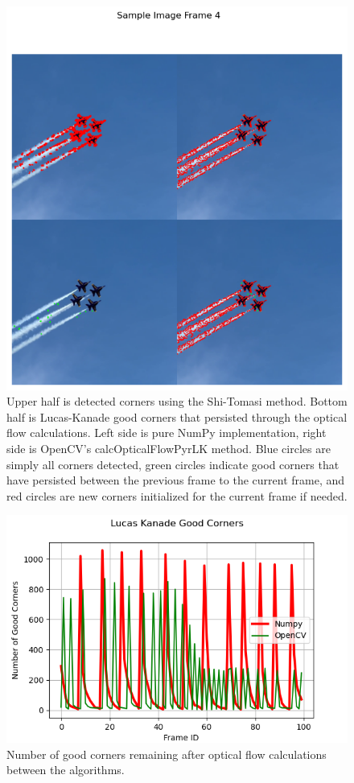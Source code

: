 \documentclass[11pt, conference, letterpaper]{IEEEtran}
\begin{document}
\onecolumn
\begin{figure}[h]
    \centering
    \includegraphics[width=0.8\linewidth]{images/sample_image_4.png}
    \caption{Upper half is detected corners using the Shi-Tomasi method. Bottom half is Lucas-Kanade good corners that persisted through the optical flow calculations. Left side is pure NumPy implementation, right side is OpenCV's calcOpticalFlowPyrLK method. Blue circles are simply all corners detected, green circles indicate good corners that have persisted between the previous frame to the current frame, and red circles are new corners initialized for the current frame if needed.}
    \label{fig:sample_5}
\end{figure}
\twocolumn

\begin{figure}[t]
    \centering
    \includegraphics[width=0.9\linewidth]{images/lk_good_corners.png}
    \caption{Number of good corners remaining after optical flow calculations between the algorithms.}
    \label{fig:lk-corners}
\end{figure}
\end{document}
